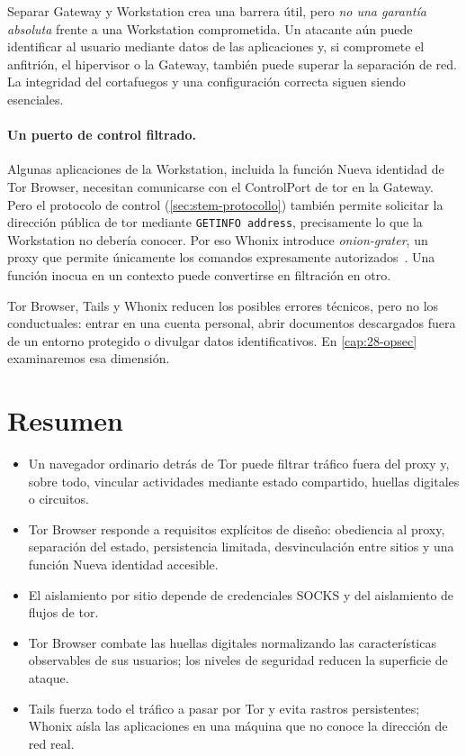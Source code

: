 Separar Gateway y Workstation crea una barrera útil, pero \emph{no una garantía absoluta} frente a una Workstation comprometida. Un atacante aún puede identificar al usuario mediante datos de las aplicaciones y, si compromete el anfitrión, el hipervisor o la Gateway, también puede superar la separación de red. La integridad del cortafuegos y una configuración correcta siguen siendo esenciales.

\paragraph{Un puerto de control filtrado.} Algunas aplicaciones de la Workstation, incluida la función Nueva identidad de Tor Browser, necesitan comunicarse con el ControlPort de tor en la Gateway. Pero el protocolo de control (\cref{sec:stem-protocollo}) también permite solicitar la dirección pública de tor mediante \texttt{GETINFO address}, precisamente lo que la Workstation no debería conocer. Por eso Whonix introduce \emph{onion-grater}, un proxy que permite únicamente los comandos expresamente autorizados~\cite{whonixgrater}. Una función inocua en un contexto puede convertirse en filtración en otro.

\begin{attenzione}
Tor Browser, Tails y Whonix reducen los posibles errores técnicos, pero no los conductuales: entrar en una cuenta personal, abrir documentos descargados fuera de un entorno protegido o divulgar datos identificativos. En \cref{cap:28-opsec} examinaremos esa dimensión.
\end{attenzione}

\section*{Resumen}
\begin{itemize}
  \item Un navegador ordinario detrás de Tor puede filtrar tráfico fuera del proxy y, sobre todo, vincular actividades mediante estado compartido, huellas digitales o circuitos.
  \item Tor Browser responde a requisitos explícitos de diseño: obediencia al proxy, separación del estado, persistencia limitada, desvinculación entre sitios y una función Nueva identidad accesible.
  \item El aislamiento por sitio depende de credenciales SOCKS y del aislamiento de flujos de tor.
  \item Tor Browser combate las huellas digitales normalizando las características observables de sus usuarios; los niveles de seguridad reducen la superficie de ataque.
  \item Tails fuerza todo el tráfico a pasar por Tor y evita rastros persistentes; Whonix aísla las aplicaciones en una máquina que no conoce la dirección de red real.
\end{itemize}

